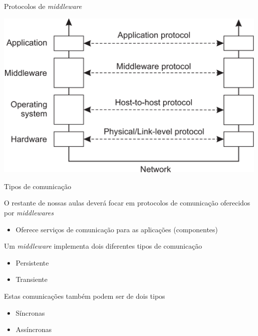 \documentclass[compress]{beamer}
\begin{document}

\begin{frame}{Protocolos de \textit{middleware}}

\vspace{0.5cm}

\centering \includegraphics[width=\textwidth]{images/osi_adapted.png}

\end{frame}


\begin{frame}{Tipos de comunicação}

O restante de nossas aulas deverá focar em protocolos de comunicação oferecidos por \textit{middlewares}
\begin{itemize}
    \item Oferece serviços de comunicação para as aplicações (componentes)
\end{itemize}

Um \textit{middleware} implementa dois diferentes tipos de comunicação
\begin{itemize}
    \item Persistente
    \item Transiente
\end{itemize}

Estas comunicações também podem ser de dois tipos
\begin{itemize}
    \item Síncronas
    \item Assíncronas
\end{itemize}
\end{frame}
\end{document}

